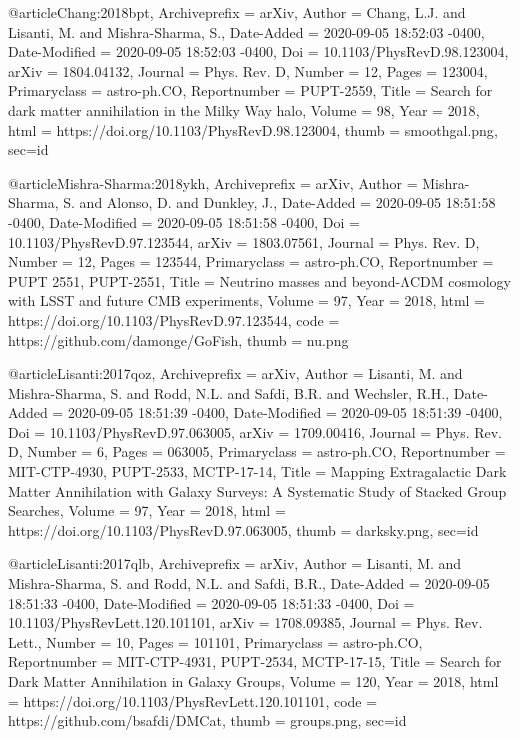 @article{Chang:2018bpt,
	Archiveprefix = {arXiv},
	Author = {Chang, L.J. and Lisanti, M. and Mishra-Sharma, S.},
	Date-Added = {2020-09-05 18:52:03 -0400},
	Date-Modified = {2020-09-05 18:52:03 -0400},
	Doi = {10.1103/PhysRevD.98.123004},
	arXiv = {1804.04132},
	Journal = {Phys. Rev. D},
	Number = {12},
	Pages = {123004},
	Primaryclass = {astro-ph.CO},
	Reportnumber = {PUPT-2559},
	Title = {{Search for dark matter annihilation in the Milky Way halo}},
	Volume = {98},
	Year = {2018},
	html = {https://doi.org/10.1103/PhysRevD.98.123004},
	thumb = {smoothgal.png},
	sec={id}}

@article{Mishra-Sharma:2018ykh,
	Archiveprefix = {arXiv},
	Author = {Mishra-Sharma, S. and Alonso, D. and Dunkley, J.},
	Date-Added = {2020-09-05 18:51:58 -0400},
	Date-Modified = {2020-09-05 18:51:58 -0400},
	Doi = {10.1103/PhysRevD.97.123544},
	arXiv = {1803.07561},
	Journal = {Phys. Rev. D},
	Number = {12},
	Pages = {123544},
	Primaryclass = {astro-ph.CO},
	Reportnumber = {PUPT 2551, PUPT-2551},
	Title = {{Neutrino masses and beyond-ΛCDM cosmology with LSST and future CMB experiments}},
	Volume = {97},
	Year = {2018},
	html = {https://doi.org/10.1103/PhysRevD.97.123544},
  	code = {https://github.com/damonge/GoFish},
	thumb = {nu.png}}

@article{Lisanti:2017qoz,
	Archiveprefix = {arXiv},
	Author = {Lisanti, M. and Mishra-Sharma, S. and Rodd, N.L. and Safdi, B.R. and Wechsler, R.H.},
	Date-Added = {2020-09-05 18:51:39 -0400},
	Date-Modified = {2020-09-05 18:51:39 -0400},
	Doi = {10.1103/PhysRevD.97.063005},
	arXiv = {1709.00416},
	Journal = {Phys. Rev. D},
	Number = {6},
	Pages = {063005},
	Primaryclass = {astro-ph.CO},
	Reportnumber = {MIT-CTP-4930, PUPT-2533, MCTP-17-14},
	Title = {{Mapping Extragalactic Dark Matter Annihilation with Galaxy Surveys: A Systematic Study of Stacked Group Searches}},
	Volume = {97},
	Year = {2018},
	html = {https://doi.org/10.1103/PhysRevD.97.063005},
	thumb = {darksky.png},
	sec={id}}

@article{Lisanti:2017qlb,
	Archiveprefix = {arXiv},
	Author = {Lisanti, M. and Mishra-Sharma, S. and Rodd, N.L. and Safdi, B.R.},
	Date-Added = {2020-09-05 18:51:33 -0400},
	Date-Modified = {2020-09-05 18:51:33 -0400},
	Doi = {10.1103/PhysRevLett.120.101101},
	arXiv = {1708.09385},
	Journal = {Phys. Rev. Lett.},
	Number = {10},
	Pages = {101101},
	Primaryclass = {astro-ph.CO},
	Reportnumber = {MIT-CTP-4931, PUPT-2534, MCTP-17-15},
	Title = {{Search for Dark Matter Annihilation in Galaxy Groups}},
	Volume = {120},
	Year = {2018},
	html = {https://doi.org/10.1103/PhysRevLett.120.101101},
	code = {https://github.com/bsafdi/DMCat},
	thumb = {groups.png},
	sec={id}}

